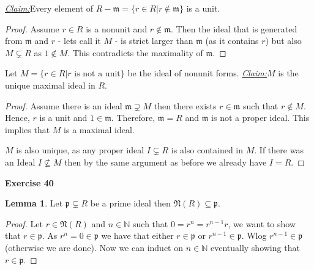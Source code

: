 \documentclass{article}
\newcommand{\N}{\mathbb{N}}
\newcommand{\m}{\mathfrak{m}}
\newcommand{\p}{\mathfrak{p}}
\newcommand{\nr}{\mathfrak{N}}
\newcommand{\claim}
{\underline{\textit{Claim:}}\hspace{0,2cm}}
\newcommand{\aufgabe}[1]{
{
	\vspace*{0.5cm}
	\noindent\textsf{\textbf{Exercise #1}}
	\vspace*{0.2cm}

}
}
\theoremstyle{definition}
\newtheorem*{silentlem}{Lemma}
\theoremstyle{plain}
\theoremstyle{remark}
\begin{document}
\claim Every element of $R-\m = \{r\in R| r \notin \m\}$ is a unit.
\begin{proof}
	Assume $r\in R$ is a nonunit and $r\notin \m$. Then the ideal that is generated from $\m$ and $r$ - lets call it $M$ - is strict larger than $\m$ (as it contains $r$) but also $M\subsetneq R$ as $1\notin M$.
	This contradicts the maximality of $\m$.
\end{proof}
	Let $M = \{r\in R| r \text{ is not a unit}\}$ be the ideal of nonunit forms. 
	\claim $M$ is the unique maximal ideal in $R$.
\begin{proof}
	Assume there is an ideal $\m \supsetneq M$ then there exists $r\in \m$ such that $r\notin M$. Hence, $r$ is a unit and $1\in \m$. Therefore, $\m = R$ and $\m$ is not a proper ideal. This implies that $M$ is a maximal ideal. 

	$M$ is also unique, as any proper ideal $I \subsetneq R$ is also contained in $M$. If there was an Ideal $I \nsubseteq M$ then by the same argument as before we already have $I = R$. 
\end{proof}
\aufgabe{40}
\begin{silentlem}
	Let $\p\subsetneq R$ be a prime ideal then $\nr(R)\subseteq \p$.
\end{silentlem}
\begin{proof}
	Let $r \in \nr(R)$ and $n\in\N$ such that $0= r^n = r^{n-1}r$, we want to show that $r\in \p$. As $r^n = 0 \in \p$ we have that either $r\in\p$ or $r^{n-1}\in\p$. Wlog $r^{n-1}\in\p$ (otherwise we are done). Now we can induct on $n\in\N$ eventually showing that $r\in\p$.
\end{proof}
\end{document}
